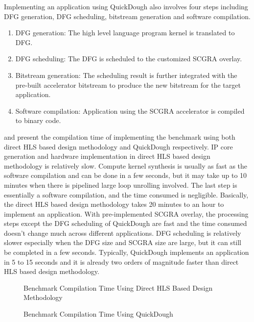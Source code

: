 Implementing an application using QuickDough also involves four steps including DFG generation, DFG scheduling, bitstream generation and software compilation.
\begin{enumerate}
\item DFG generation: The high level language program kernel is translated to DFG.
\item DFG scheduling: The DFG is scheduled to the customized SCGRA overlay. 
\item Bitstream generation: The scheduling result is further integrated with the pre-built accelerator bitstream to produce the new bitstream for the target application. 
\item Software compilation: Application using the SCGRA accelerator is compiled to binary code.
\end{enumerate}

 and  present the compilation time of implementing the benchmark using both direct HLS based design methodology and QuickDough respectively. IP core generation and hardware implementation in direct HLS based design methodology is relatively slow. Compute kernel synthesis is usually as fast as the software compilation and can be done in a few seconds, but it may take up to 10 minutes when there is pipelined large loop unrolling involved. The last step is essentially a software compilation, and the time consumed is negligible. Basically, the direct HLS based design methodology takes 20 minutes to an hour to implement an application. With pre-implemented SCGRA overlay, the processing steps except the DFG scheduling of QuickDough are fast and the time consumed doesn't change much across different applications. DFG scheduling is relatively slower especially when the DFG size and SCGRA size are large, but it can still be completed in a few seconds. Typically, QuickDough implements an application in 5 to 15 seconds and it is already two orders of magnitude faster than direct HLS based design methodology. 

\begin{figure}[htb]
\caption{Benchmark Compilation Time Using Direct HLS Based Design Methodology}
\label{fig:Vivado-HLS-Compilation-Time}
\end{figure}

\begin{figure}[htpb]
\caption{Benchmark Compilation Time Using QuickDough}
\label{fig:SCGRA-Overlay-Compilation-Time}
\end{figure}

